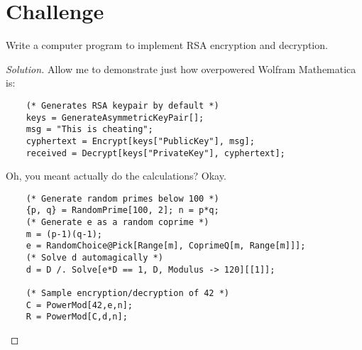\section{Challenge}
\begin{challenge}
  Write a computer program to implement RSA encryption and decryption.
\end{challenge}
\begin{proof}[Solution]
  Allow me to demonstrate just how overpowered Wolfram Mathematica is:
  \begin{verbatim}
    (* Generates RSA keypair by default *)
    keys = GenerateAsymmetricKeyPair[];
    msg = "This is cheating";
    cyphertext = Encrypt[keys["PublicKey"], msg];
    received = Decrypt[keys["PrivateKey"], cyphertext];
  \end{verbatim}
  Oh, you meant actually do the calculations? Okay.
  \begin{verbatim}
    (* Generate random primes below 100 *)
    {p, q} = RandomPrime[100, 2]; n = p*q;
    (* Generate e as a random coprime *)
    m = (p-1)(q-1);
    e = RandomChoice@Pick[Range[m], CoprimeQ[m, Range[m]]];
    (* Solve d automagically *)
    d = D /. Solve[e*D == 1, D, Modulus -> 120][[1]];

    (* Sample encryption/decryption of 42 *)
    C = PowerMod[42,e,n];
    R = PowerMod[C,d,n];
  \end{verbatim}
\end{proof}
